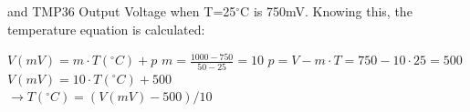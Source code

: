 \documentclass[11pt]{article}
\begin{document}
and TMP36 Output Voltage when T=25$^\circ$C is 750mV. Knowing this, the temperature equation is calculated:

\center $V(mV)=m\cdot T(^\circ C)+p$
\center $m=\frac{1000-750}{50-25}=10$
\center $p=V-m\cdot T=750-10\cdot25=500$
\center $V(mV)=10\cdot T(^\circ C)+500$
\\[1cm]
\center $\rightarrow T(^\circ C)= (V(mV)-500)/10$
\end{document}
